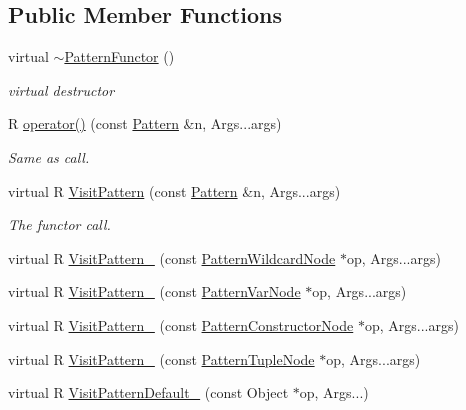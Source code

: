 \subsection*{Public Member Functions}
\begin{DoxyCompactItemize}
\item 
virtual \hyperlink{classtvm_1_1relay_1_1PatternFunctor_3_01R_07const_01Pattern_01_6n_00_01Args_8_8_8_08_4_a4c56c067b4d7406fc5267fca717833a8}{$\sim$\+Pattern\+Functor} ()
\begin{DoxyCompactList}\small\item\em virtual destructor \end{DoxyCompactList}\item 
R \hyperlink{classtvm_1_1relay_1_1PatternFunctor_3_01R_07const_01Pattern_01_6n_00_01Args_8_8_8_08_4_ab69db8ff3c90fc7a91673a5b9f7493f3}{operator()} (const \hyperlink{classtvm_1_1relay_1_1Pattern}{Pattern} \&n, Args...\+args)
\begin{DoxyCompactList}\small\item\em Same as call. \end{DoxyCompactList}\item 
virtual R \hyperlink{classtvm_1_1relay_1_1PatternFunctor_3_01R_07const_01Pattern_01_6n_00_01Args_8_8_8_08_4_abcf80d4f5b0aca1c3a373000b747673c}{Visit\+Pattern} (const \hyperlink{classtvm_1_1relay_1_1Pattern}{Pattern} \&n, Args...\+args)
\begin{DoxyCompactList}\small\item\em The functor call. \end{DoxyCompactList}\item 
virtual R \hyperlink{classtvm_1_1relay_1_1PatternFunctor_3_01R_07const_01Pattern_01_6n_00_01Args_8_8_8_08_4_ad8e3b155b95a5504666c182a470c99d7}{Visit\+Pattern\+\_\+} (const \hyperlink{classtvm_1_1relay_1_1PatternWildcardNode}{Pattern\+Wildcard\+Node} $\ast$op, Args...\+args)
\item 
virtual R \hyperlink{classtvm_1_1relay_1_1PatternFunctor_3_01R_07const_01Pattern_01_6n_00_01Args_8_8_8_08_4_aadcac1521b0deb3a6c35a6ca89c02794}{Visit\+Pattern\+\_\+} (const \hyperlink{classtvm_1_1relay_1_1PatternVarNode}{Pattern\+Var\+Node} $\ast$op, Args...\+args)
\item 
virtual R \hyperlink{classtvm_1_1relay_1_1PatternFunctor_3_01R_07const_01Pattern_01_6n_00_01Args_8_8_8_08_4_aa770e826edec27f4e8c28dd9f531d190}{Visit\+Pattern\+\_\+} (const \hyperlink{classtvm_1_1relay_1_1PatternConstructorNode}{Pattern\+Constructor\+Node} $\ast$op, Args...\+args)
\item 
virtual R \hyperlink{classtvm_1_1relay_1_1PatternFunctor_3_01R_07const_01Pattern_01_6n_00_01Args_8_8_8_08_4_aec2751be0d75f51e6699672bd06492e7}{Visit\+Pattern\+\_\+} (const \hyperlink{classtvm_1_1relay_1_1PatternTupleNode}{Pattern\+Tuple\+Node} $\ast$op, Args...\+args)
\item 
virtual R \hyperlink{classtvm_1_1relay_1_1PatternFunctor_3_01R_07const_01Pattern_01_6n_00_01Args_8_8_8_08_4_ad71efcd0b9a937b35f7fd4e2b6131773}{Visit\+Pattern\+Default\+\_\+} (const Object $\ast$op, Args...)
\end{DoxyCompactItemize}


